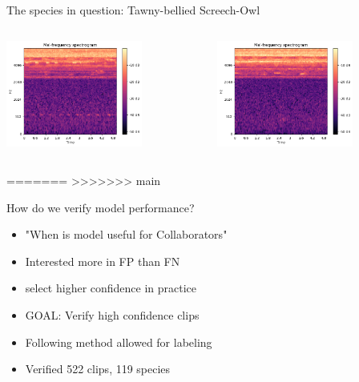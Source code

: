 \begin{frame}{The species in question: Tawny-bellied Screech-Owl}
    \begin{columns}
        \begin{column}{0.5\textwidth}
            \includegraphics[height=1\textheight,width=0.7\textwidth,keepaspectratio]{./images/image (6).png}
        \end{column}
        \begin{column}{0.5\textwidth}
            \includegraphics[height=1\textheight,width=0.7\textwidth,keepaspectratio]{./images/image (7).png}
        \end{column}
    \end{columns}
\end{frame}

=======
>>>>>>> main

\begin{frame}{How do we verify model performance?}
    \begin{itemize}
        \item "When is model useful for Collaborators"
        \item Interested more in FP than FN
        \item select higher confidence in practice
        \item GOAL: Verify high confidence clips
        \item Following method allowed for labeling
        \item Verified 522 clips, 119 species
    \end{itemize}
\end{frame}

